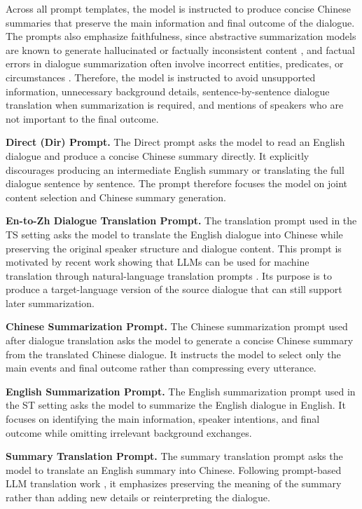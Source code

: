\documentclass[11pt]{article}
\begin{document}
Across all prompt templates, the model is instructed to produce concise Chinese
summaries that preserve the main information and final outcome of the dialogue.
The prompts also emphasize faithfulness, since abstractive summarization models
are known to generate hallucinated or factually inconsistent content
\citep{maynez-etal-2020-faithfulness}, and factual errors in dialogue
summarization often involve incorrect entities, predicates, or circumstances
\citep{zhu-etal-2023-diasumfact}. Therefore, the model is instructed to avoid
unsupported information, unnecessary background details, sentence-by-sentence
dialogue translation when summarization is required, and mentions of speakers
who are not important to the final outcome.

\medskip
\noindent\textbf{Direct (Dir) Prompt.}
The Direct prompt asks the model to read an English dialogue and produce a
concise Chinese summary directly. It explicitly discourages producing an
intermediate English summary or translating the full dialogue sentence by
sentence. The prompt therefore focuses the model on joint content selection and
Chinese summary generation.

\medskip
\noindent\textbf{En-to-Zh Dialogue Translation Prompt.}
The translation prompt used in the TS setting asks the model to translate the
English dialogue into Chinese while preserving the original speaker structure
and dialogue content. This prompt is motivated by recent work showing that LLMs
can be used for machine translation through natural-language translation
prompts \citep{jiao-etal-2023-chatgpt-translator}. Its purpose is to produce a
target-language version of the source dialogue that can still support later
summarization.

\medskip
\noindent\textbf{Chinese Summarization Prompt.}
The Chinese summarization prompt used after dialogue translation asks the model
to generate a concise Chinese summary from the translated Chinese dialogue. It
instructs the model to select only the main events and final outcome rather than
compressing every utterance.

\medskip
\noindent\textbf{English Summarization Prompt.}
The English summarization prompt used in the ST setting asks the model to
summarize the English dialogue in English. It focuses on identifying the main
information, speaker intentions, and final outcome while omitting irrelevant
background exchanges.

\medskip
\noindent\textbf{Summary Translation Prompt.}
The summary translation prompt asks the model to translate an English summary
into Chinese. Following prompt-based LLM translation work
\citep{jiao-etal-2023-chatgpt-translator}, it emphasizes preserving the meaning
of the summary rather than adding new details or reinterpreting the dialogue.
\end{document}
